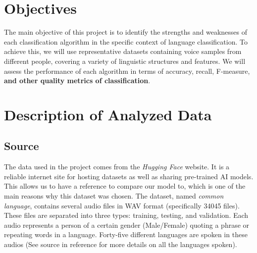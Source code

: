 \documentclass[11pt]{article}
\begin{document}
\section{Objectives}
The main objective of this project is to identify the strengths and weaknesses of each classification algorithm in the specific context of language classification. To achieve this, we will use representative datasets containing voice samples from different people, covering a variety of linguistic structures and features. We will assess the performance of each algorithm in terms of accuracy, recall, F-measure, \textbf{and other quality metrics of classification}.

\section{Description of Analyzed Data}
\subsection{Source}
The data used in the project comes from the \textit{Hugging Face} website. It is a reliable internet site for hosting datasets as well as sharing pre-trained AI models. This allows us to have a reference to compare our model to, which is one of the main reasons why this dataset was chosen.
The dataset, named \textit{common language}, contains several audio files in WAV format (specifically 34045 files). These files are separated into three types: training, testing, and validation. Each audio represents a person of a certain gender (Male/Female) quoting a phrase or repeating words in a language. Forty-five different languages are spoken in these audios (See source in reference for more details on all the languages spoken).
\end{document}
